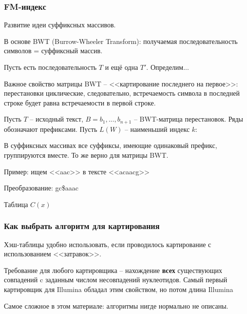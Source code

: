 \documentclass[main.tex]{subfiles}
\begin{document}
    \subsubsection{FM-индекс}

    Развитие идеи суффиксных массивов.

    В основе BWT (Burrow-Wheeler Transform): получаемая последовательность символов = суффиксный массив.

    Пусть есть последовательность $ T $ и ещё одна  $ T' $. Определим...

    Важное свойство матрицы BWT -- <<картирование последнего на первое>>: перестановки циклические, следовательно, встречаемость символа в последней строке будет равна встречаемости в первой строке.

    Пусть $T$ -- исходный текст, $ B = b_1, ..., b_{n+1} $ -- BWT-матрица перестановок.
    Ряды обозначают префиксами.
    Пусть $ L(W) $ -- наименьший индекс $ k $:

    В суффиксных массивах все суффиксы, имеющие одинаковый префикс, группируются вместе.
    То же верно для матрицы  BWT.


    Пример: ищем <<aac>> в тексте <<acaacg>>

    Преобразование: gc\$aaac

    Таблица $ C(x) $

    \subsubsection{Как выбрать алгоритм для картирования}

    Хэш-таблицы удобно использовать, если проводилось картирование с использованием <<затравок>>.

    Требование для любого картировщика -- нахождение \textbf{всех} существующих совпадений c заданным числом несовпадений нуклеотидов.
    Самый первый картировщик для Illumina обладал этим свойством, но потом длина Illumina

    Самое сложное в этом материале: алгоритмы нигде нормально не описаны.
\end{document}
